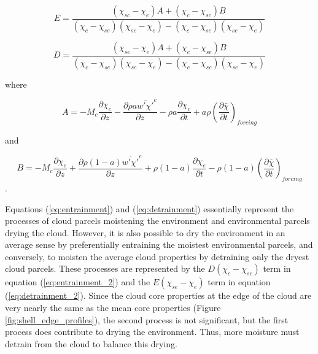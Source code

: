 \documentclass[12pt]{article}
\begin{document}
\begin{equation}
  \label{eq:final_entrainment}
    E = \frac{(\chi_{sc} - \chi_e)A + (\chi_c - \chi_{sc})B}
             {(\chi_c - \chi_{se})(\chi_{sc} - \chi_e) 
            - (\chi_c - \chi_{sc})(\chi_{se} - \chi_e)}
\end{equation}

\begin{equation}
  \label{eq:final_detrainment}
    D = \frac{(\chi_{se} - \chi_e)A + (\chi_c - \chi_{se})B}
             {(\chi_c - \chi_{se})(\chi_{sc} - \chi_e) 
            - (\chi_c - \chi_{sc})(\chi_{se} - \chi_e)}
\end{equation}

where

\begin{equation}
  \label{eq:A_equation}
    A = - M_c \frac{\partial \chi_c}{\partial z}
        - \frac{\partial \rho a \overline{w' \chi'}^c}{\partial z}
        - \rho a \frac{\partial \chi_c}{\partial t}
        + a \rho \left(\frac{\partial \bar{\chi}}{\partial t}\right)_{forcing}
\end{equation}

and

\begin{equation}
  \label{eq:B_equation}
    B = - M_c \frac{\partial \chi_e}{\partial z}
        + \frac{\partial \rho (1 - a) \overline{w' \chi'}^e}{\partial z}
        + \rho (1 - a) \frac{\partial \chi_e}{\partial t}
        - \rho (1 - a) \left(\frac{\partial \bar{\chi}}{\partial t}\right)_{forcing}
\end{equation}.

Equations (\ref{eq:entrainment}) and (\ref{eq:detrainment}) essentially 
represent the processes of cloud parcels moistening the environment and 
environmental parcels drying the cloud.  However, it is also possible to dry 
the environment in an average sense by preferentially entraining the moistest 
environmental parcels, and conversely, to moisten the average cloud properties 
by detraining only the dryest cloud parcels.  These processes are represented 
by the $D (\chi_c - \chi_{sc})$ term in equation (\ref{eq:entrainment_2}) and 
the $E (\chi_{se} - \chi_e)$ term in equation (\ref{eq:detrainment_2}).  Since 
the cloud core properties at the edge of the cloud are very nearly the same as 
the mean core properties (Figure \ref{fig:shell_edge_profiles}), the second 
process is not significant, but the first process does contribute to drying the 
environment.  Thus, more moisture must detrain from the cloud to balance this 
drying.
\end{document}
